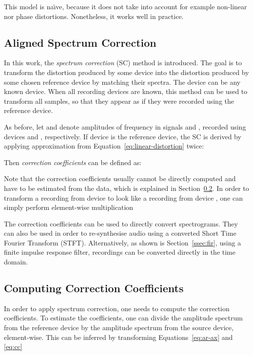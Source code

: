 \documentclass[a4paper]{article}
\begin{document}
This model is na\"{\i}ve, because it does not take into account for example non-linear nor phase distortions. Nonetheless, it works well in practice.





\subsection{Aligned Spectrum Correction}
\label{ssec:aligned-spectrum-correction}

In this work, the \textit{spectrum correction} (SC) method is introduced. The goal is to transform the distortion produced by some device  into the distortion produced by some chosen reference device  by matching their spectra. The device  can be any known device. When all recording devices are known, this method can be used to transform all samples, so that they appear as if they were recorded using the reference device.

As before, let  and  denote amplitudes of frequency  in signals  and , recorded using devices  and , respectively. If device  is the reference device, the SC is derived by applying approximation from Equation~\eqref{eq:linear-distortion} twice:

Then \textit{correction coefficients} can be defined as:

Note that the correction coefficients usually cannot be directly computed and have to be estimated from the data, which is explained in Section~\ref{ssec:computing-cc}.
In order to transform a recording from device  to look like a recording from device , one can simply perform element-wise multiplication

The correction coefficients can be used to directly convert spectrograms. They can also be used in order to re-synthesise audio using a converted Short Time Fourier Transform (STFT). Alternatively, as shown is Section~\ref{ssec:fir}, using a finite impulse response filter, recordings can be converted directly in the time domain.


\subsection{Computing Correction Coefficients}
\label{ssec:computing-cc}



In order to apply spectrum correction, one needs to compute the correction coefficients. To estimate the coefficients, one can divide
the amplitude spectrum from the reference device by the amplitude spectrum from the source device, element-wise. 
This can be inferred by transforming Equations~\eqref{eq:ar-ax} and \eqref{eq:cc}
\end{document}
